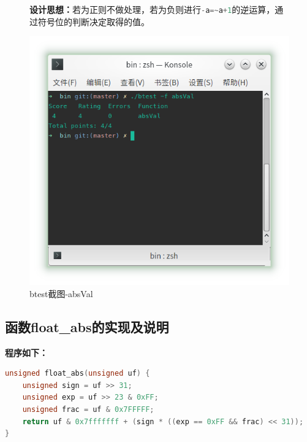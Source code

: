 \begin{figure}[H]
\begin{minipage}[c]{0.5\linewidth}
\textbf{设计思想：}若为正则不做处理，若为负则进行\lstinline[language=c]|-a=~a+1|的逆运算，通过符号位的判断决定取得的值。
\end{minipage}
\begin{minipage}[c]{0.4\linewidth}
\centering
\includegraphics[width=0.9\linewidth]{figures/absVal}
\caption{btest截图-absVal}
\label{fig:absVal}
\end{minipage}
\end{figure}

\subsection{函数float\_abs的实现及说明}
\textbf{程序如下：}

\begin{lstlisting}[language = c]
unsigned float_abs(unsigned uf) {
	unsigned sign = uf >> 31;
	unsigned exp = uf >> 23 & 0xFF;
	unsigned frac = uf & 0x7FFFFF;
	return uf & 0x7fffffff + (sign * ((exp == 0xFF && frac) << 31));
}
\end{lstlisting}

